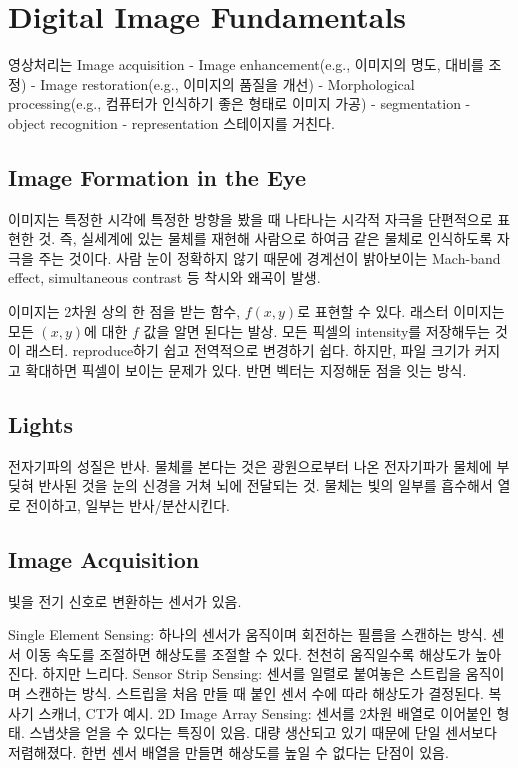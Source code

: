 \section{Digital Image Fundamentals}

영상처리는 Image acquisition - Image enhancement(e.g., 이미지의 명도, 대비를 조정) - Image restoration(e.g., 이미지의 품질을 개선) - Morphological processing(e.g., 컴퓨터가 인식하기 좋은 형태로 이미지 가공) - segmentation - object recognition - representation 스테이지를 거친다.

\subsection{Image Formation in the Eye}

이미지는 특정한 시각에 특정한 방향을 봤을 때 나타나는 시각적 자극을 단편적으로 표현한 것. 즉, 실세계에 있는 물체를 재현해 사람으로 하여금 같은 물체로 인식하도록 자극을 주는 것이다. 사람 눈이 정확하지 않기 때문에 경계선이 밝아보이는 Mach-band effect, simultaneous contrast 등 착시와 왜곡이 발생.

이미지는 2차원 상의 한 점을 받는 함수, $f(x, y)$로 표현할 수 있다. 래스터 이미지는 모든 $(x, y)$에 대한 $f$ 값을 알면 된다는 발상. 모든 픽셀의 intensity를 저장해두는 것이 래스터. reproduce하기 쉽고 전역적으로 변경하기 쉽다. 하지만, 파일 크기가 커지고 확대하면 픽셀이 보이는 문제가 있다. 반면 벡터는 지정해둔 점을 잇는 방식.

\subsection{Lights}

전자기파의 성질은 반사. 물체를 본다는 것은 광원으로부터 나온 전자기파가 물체에 부딪혀 반사된 것을 눈의 신경을 거쳐 뇌에 전달되는 것. 물체는 빛의 일부를 흡수해서 열로 전이하고, 일부는 반사/분산시킨다.

\subsection{Image Acquisition}

빛을 전기 신호로 변환하는 센서가 있음.

\bitmz
  \itm Single Element Sensing: 하나의 센서가 움직이며 회전하는 필름을 스캔하는 방식. 센서 이동 속도를 조절하면 해상도를 조절할 수 있다. 천천히 움직일수록 해상도가 높아진다. 하지만 느리다.
  \itm Sensor Strip Sensing: 센서를 일렬로 붙여놓은 스트립을 움직이며 스캔하는 방식. 스트립을 처음 만들 때 붙인 센서 수에 따라 해상도가 결정된다. 복사기 스캐너, CT가 예시.
  \itm 2D Image Array Sensing: 센서를 2차원 배열로 이어붙인 형태. 스냅샷을 얻을 수 있다는 특징이 있음. 대량 생산되고 있기 때문에 단일 센서보다 저렴해졌다. 한번 센서 배열을 만들면 해상도를 높일 수 없다는 단점이 있음.
\eitmz

